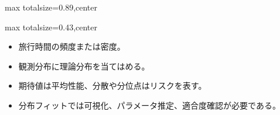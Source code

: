\begin{minipage}[t]{0.58\textwidth}
\begin{adjustbox}{max totalsize={\textwidth}{0.89\textheight},center}
\begin{minipage}{\textwidth}
\end{minipage}
\end{adjustbox}
\end{minipage}


\clearpage
{}
\begin{minipage}[t]{0.405\textwidth}
\begin{adjustbox}{max totalsize={\textwidth}{0.43\textheight},center}
\begin{minipage}{\textwidth}\scriptsize
{}\begin{itemize}
\item 旅行時間の頻度または密度。
\item 観測分布に理論分布を当てはめる。
\end{itemize}\begin{itemize}
\item 期待値は平均性能、分散や分位点はリスクを表す。
\item 分布フィットでは可視化、パラメータ推定、適合度確認が必要である。
\end{itemize}
\end{minipage}
\end{adjustbox}
\end{minipage}\hfill
